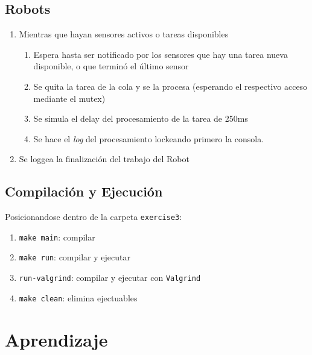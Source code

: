 \documentclass[11pt, a4paper]{article}
\begin{document}
\begin{multicols}{2}
\subsection{Robots}

\begin{enumerate}[label=\Roman*.]
    \item Mientras que hayan sensores activos o tareas disponibles
    \begin{enumerate}[label=\roman*.]
        \item Espera hasta ser notificado por los sensores que hay una tarea nueva disponible,
        o que terminó el último sensor
        \item Se quita la tarea de la cola y se la procesa (esperando el respectivo acceso mediante
        el mutex)
        \item Se simula el delay del procesamiento de la tarea de 250ms
        \item Se hace el \textit{log} del procesamiento lockeando primero la consola.
    \end{enumerate}
    \item Se loggea la finalización del trabajo del Robot
\end{enumerate}

\subsection{Compilación y Ejecución}

Posicionandose dentro de la carpeta \lstinline|exercise3|:

\begin{enumerate}[label=\roman*.]
    \item \lstinline|make main|: compilar
    \item \lstinline|make run|: compilar y ejecutar
    \item \lstinline|run-valgrind|: compilar y ejecutar con \lstinline|Valgrind|
    \item \lstinline|make clean|: elimina ejectuables
\end{enumerate}
\section*{Aprendizaje}


\end{multicols}
\end{document}
